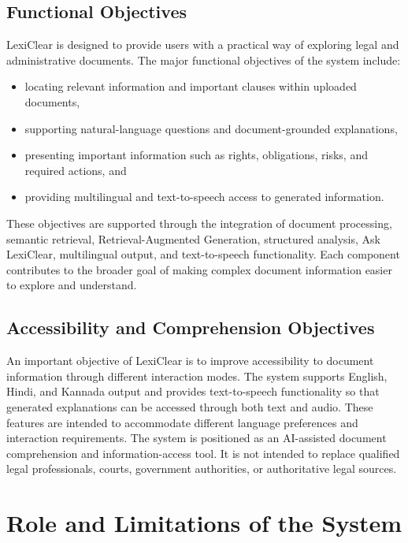\documentclass[12pt,a4paper,oneside]{report}
\begin{document}
\subsection{Functional Objectives}

LexiClear is designed to provide users with a practical way of exploring
legal and administrative documents. The major functional objectives of the
system include:

\begin{itemize}
    \item locating relevant information and important clauses within uploaded documents,
    \item supporting natural-language questions and document-grounded explanations,
    \item presenting important information such as rights, obligations, risks, and required actions, and
    \item providing multilingual and text-to-speech access to generated information.
\end{itemize}

These objectives are supported through the integration of document
processing, semantic retrieval, Retrieval-Augmented Generation, structured
analysis, Ask LexiClear, multilingual output, and text-to-speech
functionality. Each component contributes to the broader goal of making
complex document information easier to explore and understand.

\subsection{Accessibility and Comprehension Objectives}

An important objective of LexiClear is to improve accessibility to document
information through different interaction modes. The system supports English,
Hindi, and Kannada output and provides text-to-speech functionality so that
generated explanations can be accessed through both text and audio. These
features are intended to accommodate different language preferences and
interaction requirements. The system is positioned as an AI-assisted document comprehension and
information-access tool. It is not intended to replace qualified legal
professionals, courts, government authorities, or authoritative legal
sources. 

\section{Role and Limitations of the System}
\end{document}
